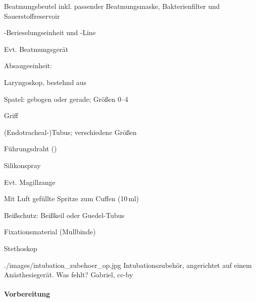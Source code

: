 {
\begin{compactenum}
    \item Beatmungsbeutel inkl. passender Beatmungsmaske, Bakterienfilter und
    Sauerstoffreservoir
    \item {}-Berieselungseinheit und -Line
    \item Evt. Beatmungsgerät
    \item Absaugeeinheit: \par{}
    \item Laryngoskop, bestehnd aus
    \begin{compactenum}
        \item Spatel: gebogen oder gerade; Größen 0--4
        \item Griff
    \end{compactenum}
    \item (Endotracheal-)Tubus; verschiedene Größen
    \item Führungsdraht ()
    \item Silikonspray
    \item Evt. Magillzange
    \item Mit Luft gefüllte Spritze zum Cuffen (10\,ml)
    \item Beißschutz: Beißkeil oder Guedel-Tubus
    \item Fixationsmaterial (Mullbinde)
    \item Stethoskop
\end{compactenum}
}
{}
{./images/intubation_zubehoer_op.jpg}
{Intubationszubehör, angerichtet auf
einem Anästhesiegerät. Was fehlt? %
}
{Gabriel, cc-by}





\paragraph*{Vorbereitung}~



